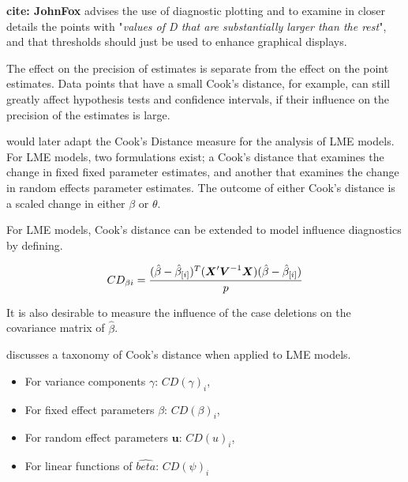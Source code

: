 \documentclass[12pt, a4paper]{report}
\theoremstyle{plain}
\theoremstyle{definition}
\theoremstyle{remark}
\begin{document}


\textbf{cite: JohnFox} advises the use of diagnostic plotting and to examine in closer details the points with "\textit{values of D that are substantially larger than the rest}", and that thresholds should just be used to enhance graphical displays.


The effect on the precision of estimates is separate from the effect on the point estimates. Data points that have a small Cook's distance, for example, can still greatly affect hypothesis tests and confidence intervals, if their  influence on the precision of the estimates is large.

%
%
\citet{CPJ} would later adapt the Cook's Distance measure for the analysis of LME models. For LME models, two formulations exist; a Cook's distance that examines the change in fixed fixed parameter estimates, and another that examines the change in random effects parameter estimates. The outcome of either Cook's distance is a scaled change in either $\beta$ or $\theta$.

For LME models, Cook's distance can be extended to model influence diagnostics by defining.

\[ CD_{\beta i} = {(\hat{\beta} - \hat{\beta}_{[i]})^{T}(\boldsymbol{X}^{\prime}\boldsymbol{V}^{-1}\boldsymbol{X}) (\hat{\beta} - \hat{\beta}_{[i]}) \over p}\]

It is also desirable to measure the influence of the case deletions on the covariance matrix of $\hat{\beta}$.


\citet{schabenberger} discusses a taxonomy of Cook's distance when applied to LME models. \begin{itemize}
	\item For variance components $\gamma$: $CD(\gamma)_i$,
	\item For fixed effect parameters $\beta$: $CD(\beta)_i$,
	\item For random effect parameters $\boldsymbol{u}$: $CD(u)_i$,
	\item For linear functions of $\hat{beta}$: $CD(\psi)_i$
\end{itemize}			
\end{document}
